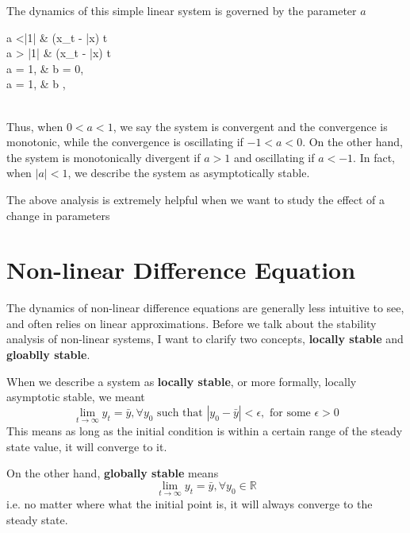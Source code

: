 \documentclass[twocolumn, fleqn]{article}
\begin{document}
		The dynamics of this simple linear system is governed by the parameter $a$\\[4pt]
		\begin{cases}
			\forall a <|1| & (x_t - \bar{x})   t \rightarrow \infty\\
			\forall a > |1| & (x_t - \bar{x}) \rightarrow \infty {} t \rightarrow \infty\\
			 a = 1, &  b = 0, \\
			 a = 1, &  b  , \\
		\end{cases}\\[4pt]
		Thus, when $0<a <1$, we say the system is convergent and the convergence is monotonic, while the convergence is
		oscillating if $-1 < a<0$.
		On the other hand, the system is monotonically divergent if $a>1$ and oscillating if $a<-1$.
		In fact, when $|a|<1$, we describe the system as asymptotically stable.

		The above analysis is extremely helpful when we want to study the effect of a change in parameters

	\section{Non-linear Difference Equation}
		The dynamics of non-linear difference equations are generally less intuitive to see, and often relies on
		linear approximations.
		Before we talk about the stability analysis of non-linear systems, I want to clarify two concepts,
		\textbf{locally stable} and \textbf{gloablly stable}.

		When we describe a system as \textbf{locally stable}, or more formally, locally asymptotic stable, we meant
		\begin{equation*}
			\lim_{t\rightarrow\infty} y_t =\bar{y}, \forall y_0 \text{ such that } |y_0-\bar{y}|<\epsilon, \text{ for
			some } \epsilon >0
		\end{equation*}
		This means as long as the initial condition is within a certain range of the steady state value, it will
		converge to it.

		On the other hand, \textbf{globally stable} means
		\begin{equation*}
			\lim_{t\rightarrow\infty} y_t = \bar{y}, \forall y_0 \in \mathbb{R}
		\end{equation*}
		i.e. no matter where what the initial point is, it will always converge to the steady state.
\end{document}

